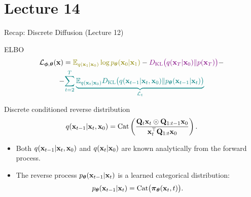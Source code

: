 \documentclass{beamer}
\begin{document}
\part{Lecture 14}

\begin{frame}
\titlepage
	\resetonslide
\end{frame}
\begin{frame}{Recap: Discrete Diffusion (Lecture 12)}
	\begin{block}{ELBO}
		\vspace{-0.7cm}
		\begin{multline*}
            \cL_{\bphi, \btheta}(\bx) =  {\color{olive}\bbE_{q(\bx_1 | \bx_0)} \log \pt(\bx_0 | \bx_1)} - {\color{violet}\KL\bigl(q(\bx_T | \bx_0) \| p(\bx_T)\bigr)} - \\
            - {\color{teal}\sum_{t=2}^T \underbrace{ \bbE_{q(\bx_t | \bx_0)} \KL \bigl(q(\bx_{t-1} | \bx_t, \bx_0) \| \pt(\bx_{t-1} | \bx_t)\bigr)}_{\cL_t}}
        \end{multline*}
		\vspace{-0.7cm}
	\end{block}
	\begin{block}{Discrete conditioned reverse distribution}
		\[
			q(\mathbf{x}_{t-1} | \mathbf{x}_t, \mathbf{x}_0)
			= \operatorname{Cat}\left(\frac{\mathbf{Q}_t \mathbf{x}_t \odot \mathbf{Q}_{1:t-1} \mathbf{x}_0}{\mathbf{x}_t^{\top}\mathbf{Q}_{1:t}\mathbf{x}_0}\right).
		\]
		\vspace{-0.3cm}
	\end{block}
	\begin{itemize}
		\item Both $q(\mathbf{x}_{t-1} | \mathbf{x}_t, \mathbf{x}_0)$ and $q(\mathbf{x}_t | \mathbf{x}_0)$ are known analytically from the forward process.
		\item The reverse process $p_{\boldsymbol{\theta}}(\mathbf{x}_{t-1} | \mathbf{x}_t)$ is a learned categorical distribution:
		\vspace{-0.3cm}
        \[
			p_{\boldsymbol{\theta}}(\mathbf{x}_{t-1} | \mathbf{x}_t) = \operatorname{Cat}\bigl( \boldsymbol{\pi}_{\boldsymbol{\theta}}(\mathbf{x}_t, t) \bigr).
		\]
	\end{itemize}
\end{frame}
\end{document}
